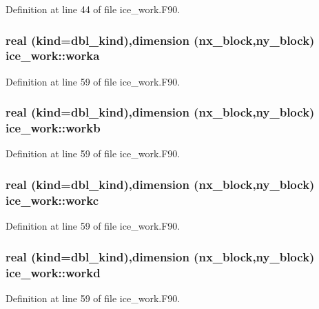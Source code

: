 Definition at line 44 of file ice\_\-work.F90.\hypertarget{namespaceice__work_aa80691ca530fe4509dd7271288a7b2b8}{
\subsubsection[{worka}]{\setlength{\rightskip}{0pt plus 5cm}real (kind=dbl\_\-kind),dimension (nx\_\-block,ny\_\-block) {\bf ice\_\-work::worka}}}
\label{namespaceice__work_aa80691ca530fe4509dd7271288a7b2b8}


Definition at line 59 of file ice\_\-work.F90.\hypertarget{namespaceice__work_a380e9742bb40ec20a9fd1c2ac2995c2f}{
\subsubsection[{workb}]{\setlength{\rightskip}{0pt plus 5cm}real (kind=dbl\_\-kind),dimension (nx\_\-block,ny\_\-block) {\bf ice\_\-work::workb}}}
\label{namespaceice__work_a380e9742bb40ec20a9fd1c2ac2995c2f}


Definition at line 59 of file ice\_\-work.F90.\hypertarget{namespaceice__work_aac3c0417ddea094a63ce0e98fc0b2a82}{
\subsubsection[{workc}]{\setlength{\rightskip}{0pt plus 5cm}real (kind=dbl\_\-kind),dimension (nx\_\-block,ny\_\-block) {\bf ice\_\-work::workc}}}
\label{namespaceice__work_aac3c0417ddea094a63ce0e98fc0b2a82}


Definition at line 59 of file ice\_\-work.F90.\hypertarget{namespaceice__work_acd825d38351494ad264a79c5795e4769}{
\subsubsection[{workd}]{\setlength{\rightskip}{0pt plus 5cm}real (kind=dbl\_\-kind),dimension (nx\_\-block,ny\_\-block) {\bf ice\_\-work::workd}}}
\label{namespaceice__work_acd825d38351494ad264a79c5795e4769}


Definition at line 59 of file ice\_\-work.F90.